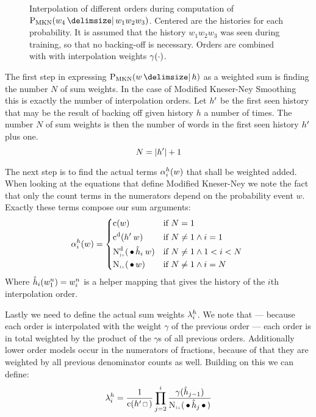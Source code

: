 \begin{figure}[htb]
  \centering
  
  \caption{
    Interpolation of different orders during computation of
    $\ProbMKN{w_4}{w_1 w_2 w_3}$.
    Centered are the histories for each probability.
    It is assumed that the history $w_1 w_2 w_3$ was seen during training, so
    that no backing-off is necessary.
    Orders are combined with with interpolation weights $\gamma(\cdot)$.
  }
  \label{fig:history-mkn}
\end{figure}

The first step in expressing $\ProbMKN{w}{h}$ as a weighted sum is finding the
number $N$ of sum weights.
In the case of Modified Kneser-Ney Smoothing this is exactly the number of
interpolation orders.
Let $h^\prime$ be the first seen history that may be the result of backing
off given history $h$ a number of times.
The number $N$ of sum weights is then the number of words in the first seen
history $h^\prime$ plus one.
\begin{equation}
  N = {\left|h^\prime\right|} + 1
\end{equation}

The next step is to find the actual terms $\alpha_i^h(w)$ that shall be
weighted added.
When looking at the equations that define Modified Kneser-Ney we note the fact
that only the count terms in the numerators depend on the probability event $w$.
Exactly these terms compose our sum arguments:
\begin{equation}
  \SumArg_i^h(w) =
    \begin{dcases*}
      \Count(w)                                        & if $N = 1$ \\
      \DiscountedCount(\SeenHistory \: w)              & if $N \neq 1 \land i = 1$ \\
      \DiscountedCount*(\WSkp \DerivedHistory[i] \: w) & if $N \neq 1 \land 1 < i < N$ \\
      \ContCountIp(\WSkp w)                            & if $N \neq 1 \land i = N$
    \end{dcases*}
\end{equation}
Where $\DerivedHistory[i](w_1^n) = w_i^n$ is a helper mapping that gives the history
of the $i$th interpolation order.

Lastly we need to define the actual sum weights $\lambda_i^h$.
We note that --- because each order is interpolated with the weight $\gamma$ of
the previous order --- each order is in total weighted by the product of the
$\gamma$s of all previous orders.
Additionally lower order models occur in the numerators of fractions, because of
that they are weighted by all previous denominator counts as well.
Building on this we can define:
\begin{equation}
  \SumWeight_i^h = \frac{1}{\Count(\SeenHistory \Skp)} \prod_{j = 2}^i \frac{\gamma(\DerivedHistory[j-1])}{\ContCountIp(\WSkp \DerivedHistory[j] \WSkp)}
\end{equation}

